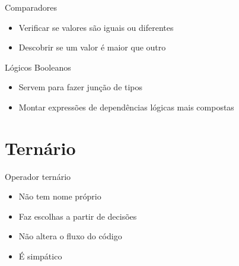 \documentclass[11pt]{beamer}
\begin{document}
	\begin{frame}{Comparadores}
		\only<1>
		{
			\begin{itemize}
				\presentationPause\item Verificar se valores são iguais ou diferentes
				\presentationPause\item Descobrir se um valor é maior que outro
			\end{itemize}
			\presentationPause
		}
		{
			
		}
	\end{frame}


	\begin{frame}{Lógicos Booleanos}
		\only<1>
		{
			\begin{itemize}
				\presentationPause\item Servem para fazer junção de tipos 
				\presentationPause\item Montar expressões de dependências lógicas mais compostas
			\end{itemize}
			\presentationPause
		}
		{
			\presentationPause
		}
	\end{frame}

\section{Ternário}
	\begin{frame}{Operador ternário}
		\only<1>
		{
			\begin{itemize}
				\presentationPause\item Não tem nome próprio \presentationPause\frownie
				\presentationPause\item Faz escolhas a partir de decisões
				\presentationPause\item Não altera o fluxo do código
				\presentationPause\item É simpático
			\end{itemize}
			\presentationPause
		}
		{
			\presentationPause
		}
	\end{frame}
\end{document}
